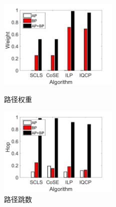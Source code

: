 \begin{figure}[htb]
\centering
\begin{minipage}[t]{0.45\linewidth}
\centering
\includegraphics[width=2.25in]{figures/weight}
\caption{路径权重}
\label{fig:normalization weitgh sum}
\end{minipage}
\hfill
\begin{minipage}[t]{0.45\linewidth}
\centering
\includegraphics[width=2.25in]{figures/hop}
\caption{路径跳数}
\label{fig:normalization hop}
\end{minipage}
\end{figure}


